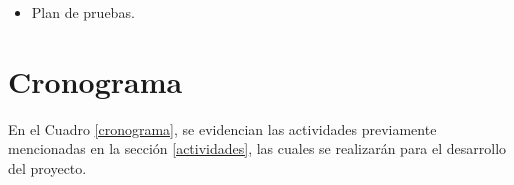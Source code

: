 \begin{itemize}
 	\item Plan de pruebas.%
 \end{itemize} 
% 
\section{Cronograma}
En el Cuadro \ref{cronograma}, se evidencian las actividades previamente mencionadas en la sección \ref{actividades}, las cuales se realizar\'an para el desarrollo del proyecto.
 
